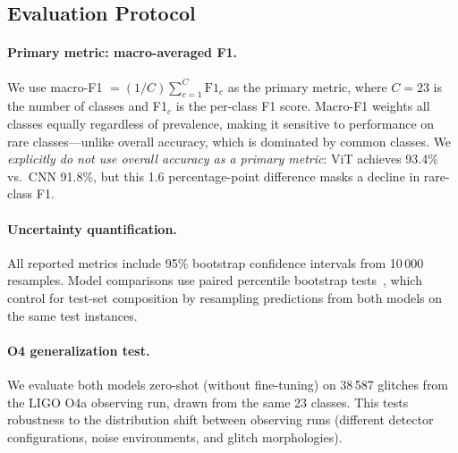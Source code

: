 \documentclass[12pt]{article}
\newcommand{\Nclasses}{23}
\newcommand{\NOfour}{38\,587}
\newcommand{\vitAccuracy}{93.4\%}
\newcommand{\cnnAccuracy}{91.8\%}
\begin{document}
\subsection{Evaluation Protocol}
\label{sec:evaluation}

\paragraph{Primary metric: macro-averaged F1.}
We use macro-F1 $= (1/C)\sum_{c=1}^{C} \text{F1}_c$ as the primary metric,
where $C = \Nclasses$ is the number of classes and F1$_c$ is the per-class
F1 score.
Macro-F1 weights all classes equally regardless of prevalence, making it
sensitive to performance on rare classes---unlike overall accuracy, which is
dominated by common classes.
We \emph{explicitly do not use overall accuracy as a primary metric}: ViT
achieves \vitAccuracy{} vs.\ CNN \cnnAccuracy, but this 1.6 percentage-point
difference masks a decline in rare-class F1.

\paragraph{Uncertainty quantification.}
All reported metrics include 95\% bootstrap confidence intervals from 10\,000
resamples.
Model comparisons use paired percentile bootstrap tests~\citep{Efron1993},
which control for test-set composition by resampling predictions from both
models on the same test instances.

\paragraph{O4 generalization test.}
We evaluate both models zero-shot (without fine-tuning) on \NOfour{} glitches
from the LIGO O4a observing run, drawn from the same \Nclasses{} classes.
This tests robustness to the distribution shift between observing runs
(different detector configurations, noise environments, and glitch
morphologies).
\end{document}
